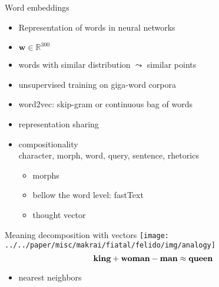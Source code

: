 \documentclass[10pt]{beamer}%
\begin{document}
\begin{frame}{Word embeddings}
  \begin{itemize}
    \item Representation of words in neural networks
    \item $\mathbf w \in \mathbb R^{300}$
    \item words with similar distribution $\leadsto$ similar points
    \item unsupervised training on giga-word corpora
    \item word2vec: skip-gram or continuous bag of words \\ \citep{Mikolov:2013d}
    \item representation sharing \\ \citep{Collobert:2011,Hashimoto:2017}
    \item compositionality \\ character, morph, word, query, sentence, rhetorics
      \begin{itemize}
        \item morphs \citep{Lazaridou:2013}
        \item bellow the word level: fastText \citep{Bojanowski:2016}
        \item thought vector \citep{Vaswani:2017}
      \end{itemize}
  \end{itemize}
\end{frame}

\begin{frame}{Meaning decomposition with vectors}
  \cite{Katz:1963,Mikolov:2013l}
  \texttt{[image: ../../paper/misc/makrai/fiatal/felido/img/analogy]}
  \[ \text{\bf king} + \text{\bf woman} - \text{\bf man} \approx \text{\bf queen}\]
      \begin{itemize}
        \item nearest neighbors
      \end{itemize}
\end{frame}
\end{document}
